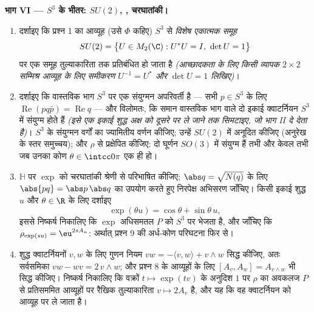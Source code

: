 \begin{problem}
\medskip
\noindent\textbf{भाग VI --- $S^3$ के भीतर: $SU(2)$, ,
चरघातांकी।}
\begin{enumerate}[resume]
  \item दर्शाइए कि प्रश्न 1 का आव्यूह  (उसे $\Phi$ कहिए)
        $S^3$ से \emph{विशेष एकात्मक समूह}
        \[
        SU(2) = \bigl\{U \in M_2(\C) : U^*U = I,\ \det U =
        1\bigr\}
        \]
        पर एक समूह तुल्याकारिता तक प्रतिबंधित हो जाता है
        \emph{(आच्छादकता के लिए किसी व्यापक $2\times2$ सम्मिश्र आव्यूह
        के लिए समीकरण $U^{-1} = U^*$ और $\det U = 1$ लिखिए)}।
  \item दर्शाइए कि वास्तविक भाग $S^3$ पर एक संयुग्मन अपरिवर्ती है
        --- सभी $p \in S^3$ के लिए $\operatorname{Re}(pq\bar p) =
        \operatorname{Re}q$ --- और विलोमतः, कि समान
        वास्तविक भाग वाले दो इकाई क्वाटर्नियन $S^3$ में संयुग्म
        होते हैं \emph{(इसे एक इकाई शुद्ध अक्ष को दूसरे पर ले
        जाने तक सिमटाइए, जो भाग II दे देता है)}। $S^3$ के संयुग्मन
        वर्गों का ज्यामितीय वर्णन कीजिए; उन्हें $SU(2)$ में अनूदित
        कीजिए (अनुरेख के स्तर समुच्चय); और $\rho$ से प्रक्षेपित
        कीजिए: दो घूर्णन $SO(3)$ में संयुग्म हैं तभी और केवल तभी जब
        उनका कोण $\theta \in \intcc0\pi$ एक ही हो।
  \item $\mathbb H$ पर $\exp$ को चरघातांकी श्रेणी से परिभाषित कीजिए;
        $\abs q =
        \sqrt{N(q)}$ के लिए $\abs{pq} = \abs p\,\abs q$ का उपयोग करते हुए निरपेक्ष अभिसरण
        जाँचिए। किसी इकाई शुद्ध $u$ और $\theta
        \in \R$ के लिए दर्शाइए
        \[
        \exp(\theta u) = \cos\theta + \sin\theta\,u ,
        \]
        इससे निष्कर्ष निकालिए कि $\exp$ अधिसमतल $P$ को $S^3$ पर
        भेजता है, और जाँचिए कि $\rho_{\exp(su)} =
        \eu^{2sA_u}$: अर्थात् प्रश्न 9 की
        अर्ध-कोण परिघटना फिर से।
  \item शुद्ध क्वाटर्नियनों $v, w$ के लिए गुणन नियम $vw = -\langle v, w\rangle + v\wedge w$ सिद्ध
        कीजिए, अतः  सर्वसमिका $vw - wv = 2\,v\wedge w$; और प्रश्न 8 के
        आव्यूहों के लिए $[A_v, A_w] = A_{v\wedge w}$ भी सिद्ध कीजिए। निष्कर्ष निकालिए कि
        वक्रों $t \mapsto \exp(tv)$ के अनुदिश $1$ पर $\rho$ का अवकलज $P$ से
        प्रतिसममित आव्यूहों पर रैखिक तुल्याकारिता $v \mapsto 2A_v$ है, और यह
        कि वह क्वाटर्नियन  को आव्यूह  पर
        ले जाता है।
\end{enumerate}


\end{problem}
